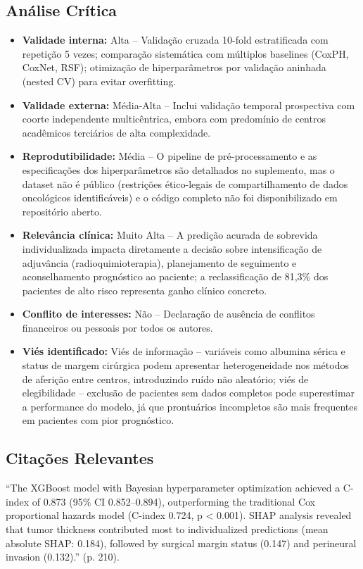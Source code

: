 \subsection{Análise Crítica}
\begin{itemize}
  \item \textbf{Validade interna:} Alta -- Validação cruzada 10-fold
        estratificada com repetição 5 vezes; comparação sistemática
        com múltiplos baselines (CoxPH, CoxNet, RSF); otimização de
        hiperparâmetros por validação aninhada (nested CV) para evitar
        overfitting.
  \item \textbf{Validade externa:} Média-Alta -- Inclui validação temporal
        prospectiva com coorte independente multicêntrica, embora com
        predomínio de centros acadêmicos terciários de alta
        complexidade.
  \item \textbf{Reprodutibilidade:} Média -- O pipeline de pré-processamento
        e as especificações dos hiperparâmetros são detalhados no
        suplemento, mas o dataset não é público (restrições ético-legais
        de compartilhamento de dados oncológicos identificáveis) e o
        código completo não foi disponibilizado em repositório aberto.
  \item \textbf{Relevância clínica:} Muito Alta -- A predição acurada de
        sobrevida individualizada impacta diretamente a decisão sobre
        intensificação de adjuvância (radioquimioterapia), planejamento
        de seguimento e aconselhamento prognóstico ao paciente; a
        reclassificação de 81,3\% dos pacientes de alto risco representa
        ganho clínico concreto.
  \item \textbf{Conflito de interesses:} Não -- Declaração de ausência de
        conflitos financeiros ou pessoais por todos os autores.
  \item \textbf{Viés identificado:} Viés de informação -- variáveis como
        albumina sérica e status de margem cirúrgica podem apresentar
        heterogeneidade nos métodos de aferição entre centros,
        introduzindo ruído não aleatório; viés de elegibilidade --
        exclusão de pacientes sem dados completos pode superestimar a
        performance do modelo, já que prontuários incompletos são mais
        frequentes em pacientes com pior prognóstico.
\end{itemize}

\subsection{Citações Relevantes}
\begin{citacao}
``The XGBoost model with Bayesian hyperparameter optimization achieved
a C-index of 0.873 (95\% CI 0.852--0.894), outperforming the traditional
Cox proportional hazards model (C-index 0.724, p < 0.001). SHAP analysis
revealed that tumor thickness contributed most to individualized
predictions (mean absolute SHAP: 0.184), followed by surgical margin
status (0.147) and perineural invasion (0.132).'' (p. 210).
\end{citacao}

